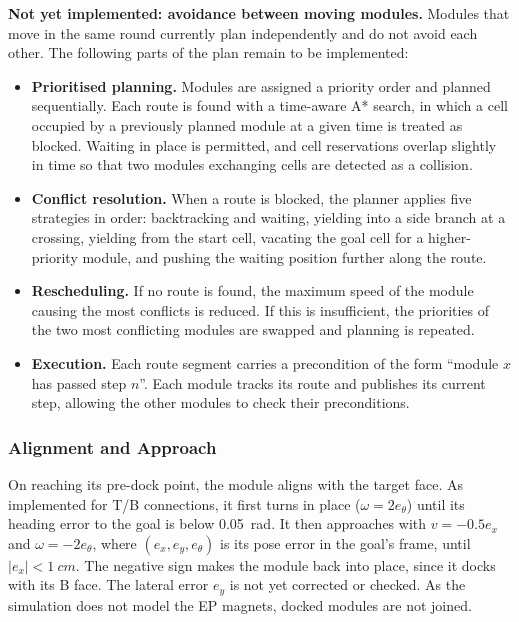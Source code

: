\documentclass[12pt,a4paper]{article}
\begin{document}
\textbf{Not yet implemented: avoidance between moving modules.} Modules that move in the same round currently plan independently and do not avoid each other. The following parts of the plan remain to be implemented:

\begin{itemize}
\item \textbf{Prioritised planning.} Modules are assigned a priority order and planned sequentially. Each route is found with a time-aware A* search, in which a cell occupied by a previously planned module at a given time is treated as blocked. Waiting in place is permitted, and cell reservations overlap slightly in time so that two modules exchanging cells are detected as a collision.
\item \textbf{Conflict resolution.} When a route is blocked, the planner applies five strategies in order: backtracking and waiting, yielding into a side branch at a crossing, yielding from the start cell, vacating the goal cell for a higher-priority module, and pushing the waiting position further along the route.
\item \textbf{Rescheduling.} If no route is found, the maximum speed of the module causing the most conflicts is reduced. If this is insufficient, the priorities of the two most conflicting modules are swapped and planning is repeated.
\item \textbf{Execution.} Each route segment carries a precondition of the form ``module $x$ has passed step $n$''. Each module tracks its route and publishes its current step, allowing the other modules to check their preconditions.
\end{itemize}

\subsubsection{Alignment and Approach}
\label{sec:nav-dock}

On reaching its pre-dock point, the module aligns with the target face. As implemented for T/B connections, it first turns in place ($\omega = 2e_\theta$) until its heading error to the goal is below \SI{0.05}{rad}. It then approaches with $v = -0.5e_x$ and $\omega = -2e_\theta$, where $(e_x, e_y, e_\theta)$ is its pose error in the goal's frame, until $|e_x| < \SI{1}{cm}$. The negative sign makes the module back into place, since it docks with its B face. The lateral error $e_y$ is not yet corrected or checked. As the simulation does not model the EP magnets, docked modules are not joined.
\end{document}
